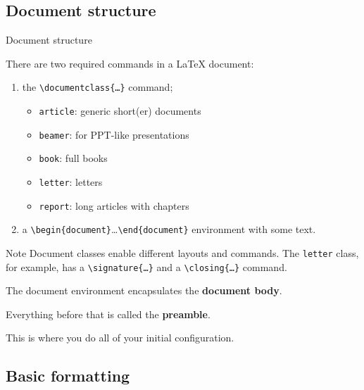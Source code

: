 \documentclass{beamer}
\newcommand{\code}[1]{\texttt{#1}}
\newcommand{\command}[2]{\texttt{\textbackslash#1\{#2\}}}
\newcommand{\latexenv}[1]{\texttt{\textbackslash{}begin\{#1\}}\ldots\texttt{\textbackslash{}end\{#1\}}}
\begin{document}
\subsection{Document structure}

\begin{frame}{Document structure}

     {
        There are two required commands in a \LaTeX{} document:

        \begin{enumerate}
            \item the \command{documentclass}{\ldots} command;
                  \begin{itemize}
                      \item \code{article}: generic short(er) documents
                      \item \code{beamer}: for PPT-like presentations
                      \item \code{book}: full books
                      \item \code{letter}: letters
                      \item \code{report}: long articles with chapters
                  \end{itemize}
            \item a \latexenv{document} environment with some text.
        \end{enumerate}

        \medskip

        \begin{block}{Note}
            Document classes enable different layouts and commands. The \code{letter} class, for example, has a \command{signature}{\ldots} and a \command{closing}{\ldots} command.
        \end{block}
    }

     {
        The document environment encapsulates the \textbf{document body}.

        \medskip

        Everything before that is called the \textbf{preamble}.

        \medskip

        This is where you do all of your initial configuration.
    }
\end{frame}

\subsection{Basic formatting}
\end{document}
